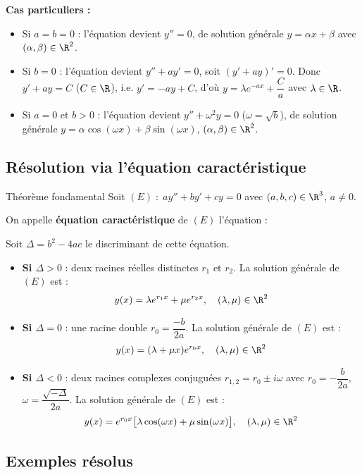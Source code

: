 \textbf{Cas particuliers :}
\begin{itemize}
  \item Si $a=b=0$ : l'\'equation devient $y''=0$, de solution g\'en\'erale
        $y=\alpha x+\beta$ avec $(\alpha,\beta)\in\R^2$.
  \item Si $b=0$ : l'\'equation devient $y''+ay'=0$, soit $(y'+ay)'=0$.
        Donc $y'+ay=C$ ($C\in\R$), i.e. $y'=-ay+C$, d'o\`u
        $y=\lambda e^{-ax}+\dfrac{C}{a}$ avec $\lambda\in\R$.
  \item Si $a=0$ et $b>0$ : l'\'equation devient $y''+\omega^2 y=0$ ($\omega=\sqrt{b}$),
        de solution g\'en\'erale $y=\alpha\cos(\omega x)+\beta\sin(\omega x)$,
        $(\alpha,\beta)\in\R^2$.
\end{itemize}

\subsection{R\'esolution via l'\'equation caract\'eristique}

\begin{Theoreme}[]{Th\'eor\`eme fondamental}
Soit $(E)\;:\;ay''+by'+cy=0$ avec $(a,b,c)\in\R^3$, $a\neq 0$.

On appelle \textbf{\'equation caract\'eristique} de $(E)$ l'\'equation :

Soit $\Delta=b^2-4ac$ le discriminant de cette \'equation.

\begin{itemize}
  \item \textbf{Si $\Delta>0$} : deux racines r\'eelles distinctes $r_1$ et $r_2$.
        La solution g\'en\'erale de $(E)$ est :
        \[y(x)=\lambda e^{r_1 x}+\mu e^{r_2 x},\quad(\lambda,\mu)\in\R^2\]
  \item \textbf{Si $\Delta=0$} : une racine double $r_0=\dfrac{-b}{2a}$.
        La solution g\'en\'erale de $(E)$ est :
        \[y(x)=(\lambda+\mu x)e^{r_0 x},\quad(\lambda,\mu)\in\R^2\]
  \item \textbf{Si $\Delta<0$} : deux racines complexes conjugu\'ees
        $r_{1,2}=r_0\pm i\omega$ avec $r_0=-\dfrac{b}{2a}$, $\omega=\dfrac{\sqrt{-\Delta}}{2a}$.
        La solution g\'en\'erale de $(E)$ est :
        \[y(x)=e^{r_0 x}\bigl[\lambda\cos(\omega x)+\mu\sin(\omega x)\bigr],
          \quad(\lambda,\mu)\in\R^2\]
\end{itemize}
\end{Theoreme}

\subsection{Exemples r\'esolus}

